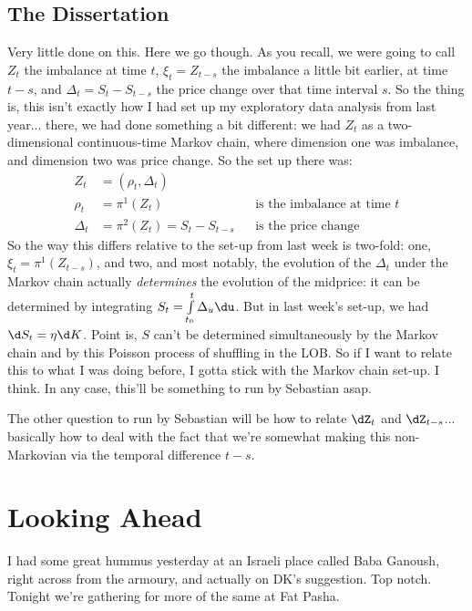 \documentclass[12pt]{article}
\begin{document}
\subsection*{The Dissertation}
Very little done on this. Here we go though. As you recall, we were going to call $Z_t$ the imbalance at time $t$, $\xi_t = Z_{t-s}$ the imbalance a little bit earlier, at time $t-s$, and $\Delta_{t} = S_t - S_{t-s}$ the price change over that time interval $s$. So the thing is, this isn't exactly how I had set up my exploratory data analysis from last year... there, we had done something a bit different: we had $Z_t$ as a two-dimensional continuous-time Markov chain, where dimension one was imbalance, and dimension two was price change. So the set up there was:
\begin{align}
Z_t & = (\rho_t, \Delta_t) \\
\rho_t & = \pi^1(Z_t) && \text{is the imbalance at time $t$} \\
\Delta_t & = \pi^2(Z_t) = S_t - S_{t-s} && \text{is the price change}
\end{align}
So the way this differs relative to the set-up from last week is two-fold: one, $\xi_t = \pi^1(Z_{t-s})$, and two, and most notably, the evolution of the $\Delta_t$ under the Markov chain actually \textit{determines} the evolution of the midprice: it can be determined by integrating $S_t = \int\limits_{t_0}^t \Delta_u \du$. But in last week's set-up, we had $\d S_t = \eta \d K$. Point is, $S$ can't be determined simultaneously by the Markov chain and by this Poisson process of shuffling in the LOB. So if I want to relate this to what I was doing before, I gotta stick with the Markov chain set-up. I think. In any case, this'll be something to run by Sebastian asap. 

The other question to run by Sebastian will be how to relate $\dZ_t$ and $\dZ_{t-s}$... basically how to deal with the fact that we're somewhat making this non-Markovian via the temporal difference $t-s$. 

\section*{Looking Ahead}
I had some great hummus yesterday at an Israeli place called Baba Ganoush, right across from the armoury, and actually on DK's suggestion. Top notch. Tonight we're gathering for more of the same at Fat Pasha. 
\end{document}

